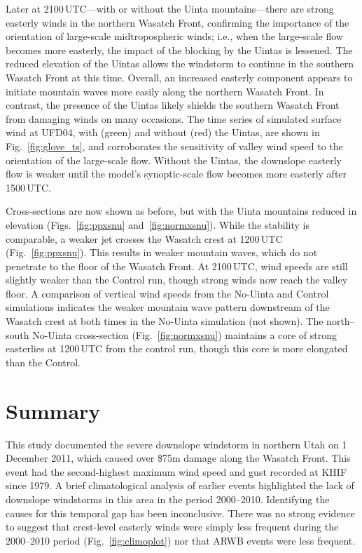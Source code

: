 \documentclass[pdftex,12pt]{article}
\begin{document}
Later at 2100\,UTC---with or without the Uinta mountains---there are strong easterly winds in the northern Wasatch Front, confirming the importance of the orientation of large-scale midtropospheric winds; i.e., when the large-scale flow becomes more easterly, the impact of the blocking by the Uintas is lessened. The reduced elevation of the Uintas allows the windstorm to continue in the southern Wasatch Front at this time. Overall, an increased easterly component appears to initiate mountain waves more easily along the northern Wasatch Front. In contrast, the presence of the Uintas likely shields the southern Wasatch Front from damaging winds on many occasions. The time series of simulated surface wind at UFD04, with (green) and without (red) the Uintas, are shown in Fig.~\ref{fig:glove_ts}, and corroborates the sensitivity of valley wind speed to the orientation of the large-scale flow. Without the Uintas, the downslope easterly flow is weaker until the model's synoptic-scale flow becomes more easterly after 1500\,UTC.

Cross-sections are now shown as before, but with the Uinta mountains reduced in elevation (Figs.~\ref{fig:ppxsnu} and~\ref{fig:normxsnu}). While the stability is comparable, a weaker jet crosses the Wasatch crest at 1200\,UTC (Fig.~\ref{fig:ppxsnu}). This results in weaker mountain waves, which do not penetrate to the floor of the Wasatch Front. At 2100\,UTC, wind speeds are still slightly weaker than the Control run, though strong winds now reach the valley floor. A comparison of vertical wind speeds from the No-Uinta and Control simulations indicates the weaker mountain wave pattern downstream of the Wasatch crest at both times in the No-Uinta simulation (not shown). The north--south No-Uinta cross-section (Fig.~\ref{fig:normxsnu}) maintains a core of strong easterlies at 1200\,UTC from the control run, though this core is more elongated than the Control. 

\section{Summary}
This study documented the severe downslope windstorm in northern Utah on 1 December 2011, which caused over \$75m damage along the Wasatch Front. This event had the second-highest maximum wind speed and gust recorded at KHIF since 1979. A brief climatological analysis of earlier events highlighted the lack of downslope windstorms in this area in the period 2000--2010. Identifying the causes for this temporal gap has been inconclusive. There was no strong evidence to suggest that crest-level easterly winds were simply less frequent during the 2000--2010 period (Fig.~\ref{fig:climoplot}) nor that ARWB events were less frequent.
\end{document}
